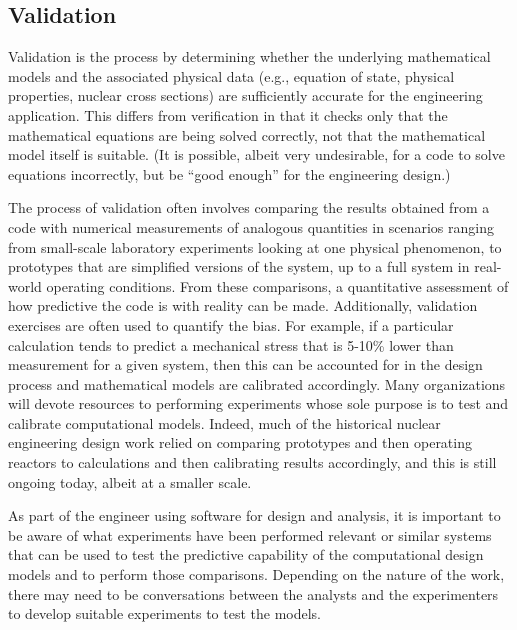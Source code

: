 \subsection{Validation}

Validation is the process by determining whether the underlying mathematical models and the associated physical data (e.g., equation of state, physical properties, nuclear cross sections) are sufficiently accurate for the engineering application. This differs from verification in that it checks only that the mathematical equations are being solved correctly, not that the mathematical model itself is suitable. (It is possible, albeit very undesirable, for a code to solve equations incorrectly, but be ``good enough'' for the engineering design.)

The process of validation often involves comparing the results obtained from a code with numerical measurements of analogous quantities in scenarios ranging from small-scale laboratory experiments looking at one physical phenomenon, to prototypes that are simplified versions of the system, up to a full system in real-world operating conditions.  From these comparisons, a quantitative assessment of how predictive the code is with reality can be made. Additionally, validation exercises are often used to quantify the bias. For example, if a particular calculation tends to predict a mechanical stress that is 5-10\% lower than measurement for a given system, then this can be accounted for in the design process and mathematical models are calibrated accordingly. Many organizations will devote resources to performing experiments whose sole purpose is to test and calibrate computational models. Indeed, much of the historical nuclear engineering design work relied on comparing prototypes and then operating reactors to calculations and then calibrating results accordingly, and this is still ongoing today, albeit at a smaller scale.

As part of the engineer using software for design and analysis, it is important to be aware of what experiments have been performed relevant or similar systems that can be used to test the predictive capability of the computational design models and to perform those comparisons. Depending on the nature of the work, there may need to be conversations between the analysts and the experimenters to develop suitable experiments to test the models.

